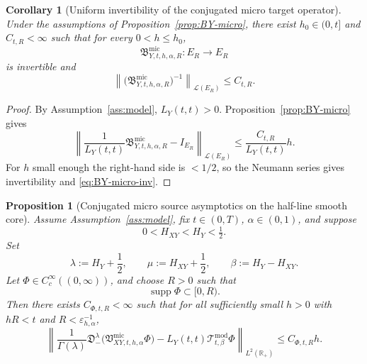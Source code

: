 \documentclass[11pt,a4paper]{amsart}
\theoremstyle{plain}
\newtheorem{proposition}[theorem]{Proposition}
\newtheorem{corollary}[theorem]{Corollary}
\theoremstyle{definition}
\theoremstyle{remark}
\newcommand{\R}{\mathbb{R}}
\begin{document}
\begin{corollary}[Uniform invertibility of the conjugated micro target operator]
\label{cor:BY-micro-invertible}
Under the assumptions of Proposition~\ref{prop:BY-micro}, there exist \(h_0\in(0,t]\) and
\(C_{t,R}<\infty\) such that for every \(0<h\le h_0\),
\[
\mathfrak B_{Y,t,h,\alpha,R}^{\mathrm{mic}}:E_R\to E_R
\]
is invertible and
\begin{equation}\label{eq:BY-micro-inv}
\left\|
\bigl(
\mathfrak B_{Y,t,h,\alpha,R}^{\mathrm{mic}}
\bigr)^{-1}
\right\|_{\mathcal L(E_R)}
\le
C_{t,R}.
\end{equation}
\end{corollary}

\begin{proof}
By Assumption~\ref{ass:model}, \(L_Y(t,t)>0\). Proposition~\ref{prop:BY-micro} gives
\[
\left\|
\frac{1}{L_Y(t,t)}\mathfrak B_{Y,t,h,\alpha,R}^{\mathrm{mic}}-I_{E_R}
\right\|_{\mathcal L(E_R)}
\le
\frac{C_{t,R}}{L_Y(t,t)}h.
\]
For \(h\) small enough the right-hand side is \(<1/2\), so the Neumann series gives
invertibility and \eqref{eq:BY-micro-inv}.
\end{proof}

\begin{proposition}[Conjugated micro source asymptotics on the half-line smooth core]
\label{prop:q-micro}
Assume Assumption~\ref{ass:model}, fix \(t\in(0,T)\), \(\alpha\in(0,1)\), and suppose
\[
0<H_{XY}<H_Y<\tfrac12.
\]
Set
\[
\lambda:=H_Y+\frac12,
\qquad
\mu:=H_{XY}+\frac12,
\qquad
\beta:=H_Y-H_{XY}.
\]
Let \(\Phi\in C_c^\infty((0,\infty))\), and choose \(R>0\) such that
\[
\operatorname{supp}\Phi\subset [0,R).
\]
Then there exists \(C_{\Phi,t,R}<\infty\) such that for all sufficiently small \(h>0\) with
\(hR<t\) and \(R<\varepsilon_{h,\alpha}^{-1}\),
\begin{equation}\label{eq:q-micro}
\left\|
\frac{1}{\Gamma(\lambda)}
\mathfrak D_-^\lambda
\bigl(
\mathfrak V_{XY,t,h,\alpha}^{\mathrm{mic}}\Phi
\bigr)
-L_Y(t,t)\mathcal T_{t,\beta}^{\mathrm{mod}}\Phi
\right\|_{L^2(\R_+)}
\le
C_{\Phi,t,R}h.
\end{equation}
\end{proposition}
\end{document}
